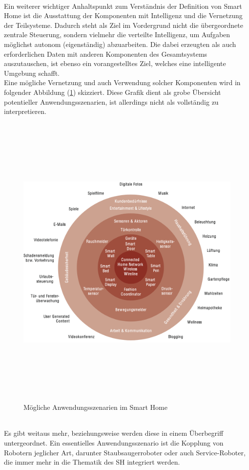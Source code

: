         \\
        Ein weiterer wichtiger Anhaltspunkt zum Verständnis der Definition von Smart Home ist die Ausstattung der Komponenten mit Intelligenz und die 
        Vernetzung der Teilsysteme. Dadurch steht als Ziel im Vordergrund nicht die übergeordnete zentrale Steuerung, sondern vielmehr die verteilte 
        Intelligenz, um Aufgaben möglichst autonom (eigenständig) abzuarbeiten. Die dabei erzeugten als auch erforderlichen Daten mit anderen 
        Komponenten des Gesamtsystems auszutauschen, ist ebenso ein vorangestelltes Ziel, welches eine intelligente Umgebung schafft. 
        \\
        Eine mögliche Vernetzung und auch Verwendung solcher Komponenten wird in folgender Abbildung (\ref{pic:szenarien-smarhome}) 
        skizziert. Diese Grafik dient als grobe Übersicht potentieller Anwendungsszenarien, ist allerdings nicht als vollständig zu interpretieren. 
        \begin{figure}[hbt!]
            \centering
            \includegraphics[width=15cm,height=15cm,keepaspectratio]{images/Anwendungsszenarien_SH.png}
            \caption{Mögliche Anwendungsszenarien im Smart Home \cite{strese.2010m}}
            \label{pic:szenarien-smarhome}
        \end{figure}
        \\
        Es gibt weitaus mehr, beziehungsweise werden diese in einem Überbegriff untergeordnet. Ein essentielles Anwendungsszenario ist die Kopplung 
        von Robotern jeglicher Art, darunter Staubsaugerroboter oder auch Service-Roboter, die immer mehr in die Thematik des \acl{SH} integriert werden. 
        
